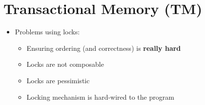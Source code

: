 \documentclass[a4paper]{article}
\begin{document}
\section{Transactional Memory (TM)}
\begin{itemize}
\item Problems using locks:
\begin{itemize}
\item Ensuring ordering (and correctness) is \textbf{really hard}
\item Locks are not composable
\item Locks are pessimistic
\item Locking mechanism is hard-wired to the program
\end{itemize}


\end{itemize}
\end{document}
